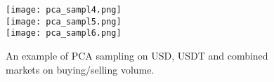 \begin{figure}[H]
	\centering
    \texttt{[image: pca\_sampl4.png]} \\
    \texttt{[image: pca\_sampl5.png]} \\
    \texttt{[image: pca\_sampl6.png]}
	\caption{An example of PCA sampling on USD, USDT and combined markets on buying/selling volume.}
    \label{fig:pca_sampl2}
\end{figure}


